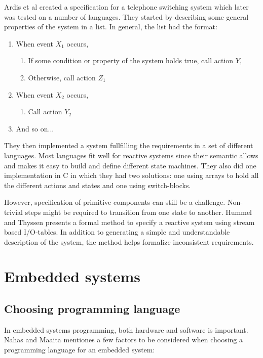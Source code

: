 Ardis et al \cite{ardis1996framework} created a specification for a telephone
switching system which later was tested on a number of languages. They started
by describing some general properties of the system in a list. In general, the
list had the format:

\begin{enumerate}
\item
  When event $X_1$ occurs,
\begin{enumerate}
\item
  If some condition or property of the system holds true, call action $Y_1$
\item
  Otherwise, call action $Z_1$
\end{enumerate}

\item
  When event $X_2$ occurs,
\begin{enumerate}
\item
  Call action $Y_2$
\end{enumerate}

\item
  And so on...
\end{enumerate}

They then implemented a system fullfilling the requirements in a set of
different languages. Most languages fit well for reactive systems since their
semantic allows and makes it easy to build and define different state machines.
They also did one implementation in C in which they had two solutions: one
using arrays to hold all the different actions and states and one using
switch-blocks.

However, specification of primitive components can still be a challenge.
Non-trivial steps might be required to transition from one state to another.
Hummel and Thyssen \cite{hummel2009behavioral} presents a formal method to
specify a reactive system using stream based I/O-tables. In addition to
generating a simple and understandable description of the system, the method
helps formalize inconsistent requirements.

\section{Embedded systems}

\subsection{Choosing programming language}

In embedded systems programming, both hardware and software is important. Nahas
and Maaita \cite{nahas2012choosing} mentiones a few factors to be considered
when choosing a programming language for an embedded system:

